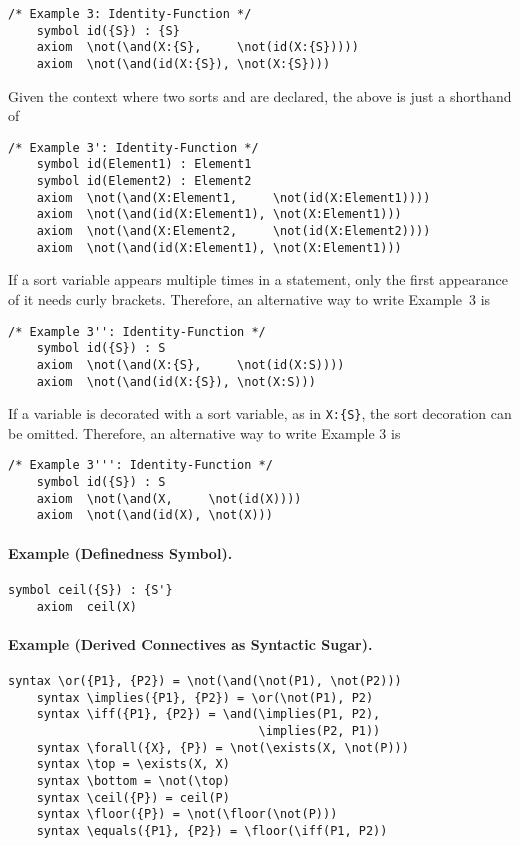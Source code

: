 \documentclass[UTF8]{article}
\theoremstyle{plain}
\theoremstyle{definition}
\theoremstyle{remark}
\DeclarePairedDelimiter{\ceil}{\lceil}{\rceil}
\DeclarePairedDelimiter{\floor}{\lfloor}{\rfloor}
\begin{document}
\begin{Verbatim}[fontsize=\small]
    /* Example 3: Identity-Function */
    symbol id({S}) : {S}
    axiom  \not(\and(X:{S},     \not(id(X:{S}))))
    axiom  \not(\and(id(X:{S}), \not(X:{S})))
\end{Verbatim}

Given the context where two sorts  and  are declared, the above is just a shorthand of

\begin{Verbatim}[fontsize=\small]
    /* Example 3': Identity-Function */
    symbol id(Element1) : Element1
    symbol id(Element2) : Element2
    axiom  \not(\and(X:Element1,     \not(id(X:Element1))))
    axiom  \not(\and(id(X:Element1), \not(X:Element1)))
    axiom  \not(\and(X:Element2,     \not(id(X:Element2))))
    axiom  \not(\and(id(X:Element1), \not(X:Element1)))
\end{Verbatim}

If a sort variable appears multiple times in a statement, only the first appearance of it needs curly brackets.
Therefore, an alternative way to write Example~3 is
\begin{Verbatim}[fontsize=\small]
    /* Example 3'': Identity-Function */
    symbol id({S}) : S
    axiom  \not(\and(X:{S},     \not(id(X:S))))
    axiom  \not(\and(id(X:{S}), \not(X:S)))
\end{Verbatim}

If a variable is decorated with a sort variable, as in {\small\verb|X:{S}|}, the sort decoration can be omitted. Therefore, an alternative way to write Example 3 is
\begin{Verbatim}[fontsize=\small]
    /* Example 3''': Identity-Function */
    symbol id({S}) : S
    axiom  \not(\and(X,     \not(id(X))))
    axiom  \not(\and(id(X), \not(X)))
\end{Verbatim}


\paragraph{Example (Definedness Symbol).}

\begin{Verbatim}[fontsize=\small]
    symbol ceil({S}) : {S'}
    axiom  ceil(X)
\end{Verbatim}

\paragraph{Example (Derived Connectives as Syntactic Sugar).}
\begin{Verbatim}[fontsize=\small]
    syntax \or({P1}, {P2}) = \not(\and(\not(P1), \not(P2)))
    syntax \implies({P1}, {P2}) = \or(\not(P1), P2)
    syntax \iff({P1}, {P2}) = \and(\implies(P1, P2), 
                                   \implies(P2, P1))
    syntax \forall({X}, {P}) = \not(\exists(X, \not(P)))
    syntax \top = \exists(X, X)
    syntax \bottom = \not(\top)
    syntax \ceil({P}) = ceil(P)
    syntax \floor({P}) = \not(\floor(\not(P)))
    syntax \equals({P1}, {P2}) = \floor(\iff(P1, P2))
\end{Verbatim}
\end{document}
